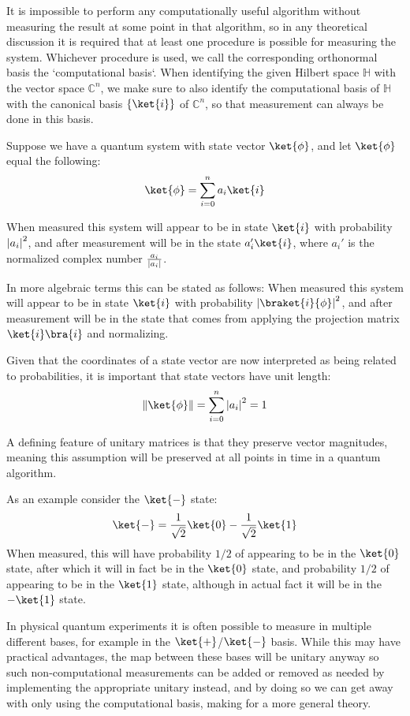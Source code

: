It is impossible to perform any computationally useful algorithm without measuring the result at some point in that algorithm, so in any theoretical discussion it is required that at least one procedure is possible for measuring the system. Whichever procedure is used, we call the corresponding orthonormal basis the `computational basis`. When identifying the given Hilbert space $\mathbb{H}$ with the vector space $\mathbb{C}^n$, we make sure to also identify the computational basis of $\mathbb{H}$ with the canonical basis $\{\ket{i}\}$ of $\mathbb{C}^n$, so that measurement can always be done in this basis.

Suppose we have a quantum system with state vector $\ket{\phi}$, and let $\ket{\phi}$ equal the following:
\[\ket{\phi} = \sum_{i=0}^n a_i\ket{i}\]

When measured this system will appear to be in state $\ket{i}$ with probability $\left| a_i \right|^2$, and after measurement will be in the state $a_i'\ket{i}$, where $a_i'$ is the normalized complex number $\frac{a_i}{\left| a_i \right|}$.

In more algebraic terms this can be stated as follows:
When measured this system will appear to be in state $\ket{i}$ with probability $\ord{\braket{i}{\phi}}^2$, and after measurement will be in the state that comes from applying the projection matrix $\ket{i}\bra{i}$ and normalizing.

Given that the coordinates of a state vector are now interpreted as being related to probabilities, it is important that state vectors have unit length:
\[\norm{\ket{\phi}} = \sum_{i=0}^n \ord{a_i}^2 = 1\]

A defining feature of unitary matrices is that they preserve vector magnitudes, meaning this assumption will be preserved at all points in time in a quantum algorithm.

As an example consider the $\ket{-}$ state:
\[\ket{-}=\frac{1}{\sqrt{2}}\ket{0} - \frac{1}{\sqrt{2}}\ket{1}\]
When measured, this will have probability $1/2$ of appearing to be in the $\ket{0}$ state, after which it will in fact be in the $\ket{0}$ state, and probability $1/2$ of appearing to be in the $\ket{1}$ state, although in actual fact it will be in the $-\ket{1}$ state.

In physical quantum experiments it is often possible to measure in multiple different bases, for example in the $\ket{+}$/$\ket{-}$ basis. While this may have practical advantages, the map between these bases will be unitary anyway so such non-computational measurements can be added or removed as needed by implementing the appropriate unitary instead, and by doing so we can get away with only using the computational basis, making for a more general theory.
